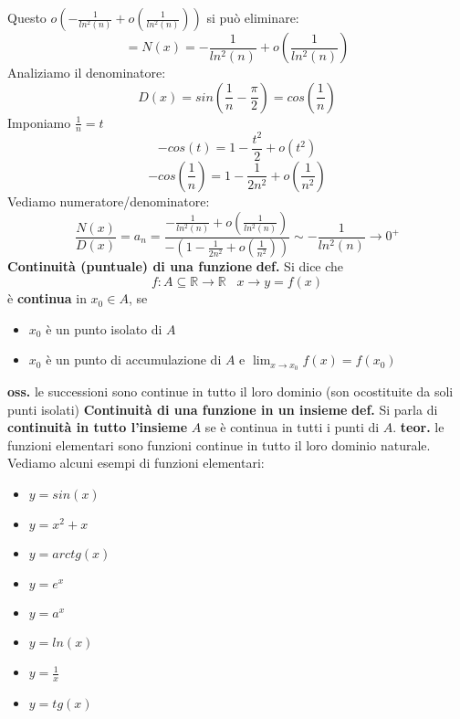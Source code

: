 Questo $o(-\frac{1}{ln^2(n)} + o(\frac{1}{ln^2(n)}))$ si può eliminare:
\[
    = N(x) = -\frac{1}{ln^2(n)} + o (\frac{1}{ln^2(n)})
\]
Analiziamo il denominatore:
\[
    D(x) = sin (\frac{1}{n} - \frac{\pi}{2}) = cos(\frac{1}{n})
\]
Imponiamo $\frac{1}{n} = t$
\[
    -cos(t) = 1-\frac{t^2}{2} + o(t^2)
\]
\[
    -cos(\frac{1}{n}) = 1- \frac{1}{2n^2} + o(\frac{1}{n^2})
\]
Vediamo numeratore/denominatore:
\[
    \frac{N(x)}{D(x)} = a_n = \frac{-\frac{1}{ln^2(n)} + o (\frac{1}{ln^2(n)})}{-(1- \frac{1}{2n^2} + o(\frac{1}{n^2}))} \sim -\frac{1}{ln^2(n)} \xrightarrow \; 0^+
\]
\newline
\newline
\newline
\newline
\textbf{Continuità (puntuale) di una funzione}
\textbf{def.} Si dice che
\[
    f: A \subseteq \mathbb{R} \rightarrow \mathbb{R} \;\;\; x \rightarrow y=f(x)
\] 
è \textbf{continua} in $x_0 \in A$, se 
\begin{itemize}
    \item $x_0$ è un punto isolato di $A$
    \item $x_0$ è un punto di accumulazione di $A$ e $\lim_{x\rightarrow x_0} f(x) = f(x_0)$
\end{itemize}
\textbf{oss.} le successioni sono continue in tutto il loro dominio (son ocostituite da soli punti isolati)
\newline
\newline
\newline
\textbf{Continuità di una funzione in un insieme}
\textbf{def.} Si parla di \textbf{continuità in tutto l'insieme} $A$ se è continua in tutti i punti di $A$.
\newline
\newline
\newline
\textbf{teor.} le funzioni elementari sono funzioni continue in tutto il loro dominio naturale.
\newline
Vediamo alcuni esempi di funzioni elementari:
\begin{itemize}
    \item $y = sin(x)$
    \item $y= x^2 + x$
    \item $y = arctg(x)$
    \item $y= e^x$
    \item $y = a^x$
    \item $y = ln(x)$
    \item $y=\frac{1}{x}$
    \item $y=tg(x)$
\end{itemize}
